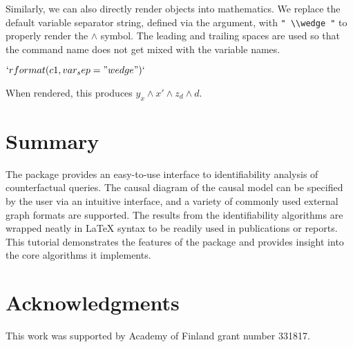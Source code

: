 Similarly, we can also directly render  objects into mathematics. We replace the default variable separator string, defined via the  argument, with \texttt{" \textbackslash{}\textbackslash{}wedge "} to properly render the \(\wedge\) symbol. The leading and trailing spaces are used so that the command name does not get mixed with the variable names.
\begin{example}
\(`r format(c1, var_sep = " \\wedge ")`\)
\end{example}
When rendered, this produces \(y_x \wedge x' \wedge z_d \wedge d\).

\section{Summary} \label{sec:summary}

The  package provides an easy-to-use interface to identifiability analysis of counterfactual queries. The causal diagram of the causal model can be specified by the user via an intuitive interface, and a variety of commonly used external graph formats are supported. The results from the identifiability algorithms are wrapped neatly in LaTeX syntax to be readily used in publications or reports. This tutorial demonstrates the features of the package and provides insight into the core algorithms it implements.

\section*{Acknowledgments}
This work was supported by Academy of Finland grant number 331817.



\address{Santtu Tikka\\
Department of Mathematics and Statistics, University of Jyv\"askyl\"a\\
P.O. Box 35, FI-40014, Finland\\
ORCiD: \href{https://orcid.org/0000-0003-4039-4342}{0000-0003-4039-4342}\\
}

